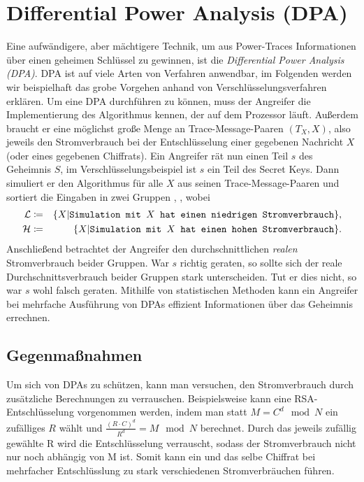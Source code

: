 \section{Differential Power Analysis (DPA)}
Eine aufwändigere, aber mächtigere Technik, um aus Power-Traces
Informationen über einen geheimen Schlüssel zu gewinnen, ist die
\emph{Differential Power Analysis (DPA)}. DPA ist auf viele Arten von
Verfahren anwendbar, im Folgenden werden wir beispielhaft das grobe
Vorgehen anhand von Verschlüsselungsverfahren erklären. Um eine DPA
durchführen zu können, muss der Angreifer die Implementierung des
Algorithmus kennen, der auf dem Prozessor läuft. Außerdem braucht er
eine möglichst große Menge an Trace-Message-Paaren $(T_X, X)$, also
jeweils den Stromverbrauch bei der Entschlüsselung einer gegebenen
Nachricht $X$ (oder eines gegebenen Chiffrats).
Ein Angreifer rät nun einen Teil $s$ des Geheimnis $S$, im
Verschlüsselungsbeispiel ist $s$ ein Teil des Secret Keys. Dann
simuliert er den Algorithmus für alle $X$ aus seinen
Trace-Message-Paaren und sortiert die Eingaben in zwei Gruppen \calL,
\calH, wobei
\begin{eqnarray*}
\mathcal{L} & \coloneqq &\{X| \texttt{Simulation mit $X$ hat einen niedrigen
  Stromverbrauch}\},\\
\mathcal{H} & \coloneqq &\{X| \texttt{Simulation mit $X$ hat einen hohen
  Stromverbrauch}\}.
\end{eqnarray*}
Anschließend betrachtet der Angreifer den durchschnittlichen
\textit{realen} Stromverbrauch beider Gruppen. War $s$ richtig geraten,
so sollte sich der reale Durchschnittsverbrauch beider Gruppen stark
unterscheiden. Tut er dies nicht, so war $s$ wohl falsch
geraten. Mithilfe von statistischen Methoden kann ein Angreifer bei
mehrfache Ausführung von DPAs effizient Informationen über das Geheimnis
errechnen. 

\subsection{Gegenmaßnahmen}
Um sich von DPAs zu schützen, kann man versuchen, den Stromverbrauch
durch zusätzliche Berechnungen zu verrauschen. Beispielsweise kann eine
RSA-Entschlüsselung vorgenommen werden, indem man statt $M = C^d \mod N$
ein zufälliges $R$ wählt und $\frac{(R\cdot C)^d}{R^d} = M \mod N$ berechnet. Durch das
jeweils zufällig gewählte R wird die Entschlüsselung verrauscht, sodass
der Stromverbrauch nicht nur noch abhängig von M ist. Somit kann ein und
das selbe Chiffrat bei mehrfacher Entschlüsslung zu stark verschiedenen
Stromverbräuchen führen. 


